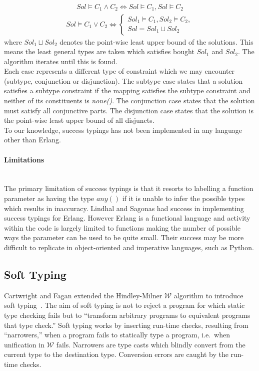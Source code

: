 \documentclass[12pt, titlepage]{article}
\begin{document}
\begin{align*} 
	Sol \models C_1 \land C_2 \iff Sol \models C_1, Sol \models  C_2
\end{align*}
\begin{align*} 
	Sol \models C_1 \lor C_2 \iff \begin{cases} Sol_1 \models C_1, Sol_2 \models C_2, \\
	                                            Sol = Sol_1 \sqcup Sol_2 \end{cases}
\end{align*}
where $Sol_1 \sqcup Sol_2$ denotes the point-wise least upper bound of the solutions. This means the least general types are taken which satisfies bought $Sol_1$ and $Sol_2$. The algorithm iterates until this is found. \\
\indent Each case represents a different type of constraint which we may encounter (subtype, conjunction or disjunction). The subtype case states that a solution satisfies a subtype constraint if the mapping satisfies the subtype constraint and neither of its constituents is \textit{none()}. The conjunction case states that the solution must satisfy all conjunctive parts. The disjunction case states that the solution is the point-wise least upper bound of all disjuncts. \\
\indent To our knowledge, success typings has not been implemented in any language other than Erlang.
\paragraph{Limitations}\mbox{} \\
The primary limitation of success typings is that it resorts to labelling a function parameter as having the type $any()$ if it is unable to infer the possible types which results in inaccuracy. Lindhal and Sagonas had success in implementing success typings for Erlang. However Erlang is a functional language and activity within the code is largely limited to functions making the number of possible ways the parameter can be used to be quite small. Their success may be more difficult to replicate in object-oriented and imperative languages, such as Python.


\subsection{Soft Typing}
Cartwright and Fagan extended the Hindley-Milner $\mathcal{W}$ algorithm to introduce soft typing~\cite{cartwright91}. The aim of soft typing is not to reject a program for which static type checking fails but to ``transform arbitrary programs to equivalent programs that type check.'' Soft typing works by inserting run-time checks, resulting from ``narrowers,'' when a program fails to statically type a program, i.e.\ when unification in $\mathcal{W}$ fails. Narrowers are type casts which blindly convert from the current type to the destination type. Conversion errors are caught by the run-time checks.
\end{document}
